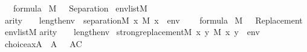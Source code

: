 \begin{isabelle}
{\isasymphi}\ {\isasymin}\ formula\ {\isasymLongrightarrow}\isanewline
{\isacharparenleft}{\kern0pt}M{\isacharcomma}{\kern0pt}\ {\isacharbrackleft}{\kern0pt}{\isacharbrackright}{\kern0pt}\ {\isasymTurnstile}\ {\isasymcdot}Separation{\isacharparenleft}{\kern0pt}{\isasymphi}{\isacharparenright}{\kern0pt}{\isasymcdot}{\isacharparenright}{\kern0pt}\ {\isasymlongleftrightarrow}\isanewline
{\isacharparenleft}{\kern0pt}{\isasymforall}env{\isasymin}list{\isacharparenleft}{\kern0pt}M{\isacharparenright}{\kern0pt}{\isachardot}{\kern0pt}\isanewline
\isaindent{{\isacharparenleft}{\kern0pt}\ \ \ }arity{\isacharparenleft}{\kern0pt}{\isasymphi}{\isacharparenright}{\kern0pt}\ {\isasymle}\ {}\ {\isacharplus}{\kern0pt}\isactrlsub {\isasymomega}\ length{\isacharparenleft}{\kern0pt}env{\isacharparenright}{\kern0pt}\ {\isasymlongrightarrow}\ separation{\isacharparenleft}{\kern0pt}{\isacharhash}{\kern0pt}{\isacharhash}{\kern0pt}M{\isacharcomma}{\kern0pt}\ {\isasymlambda}x{\isachardot}{\kern0pt}\ M{\isacharcomma}{\kern0pt}\ {\isacharbrackleft}{\kern0pt}x{\isacharbrackright}{\kern0pt}\ {\isacharat}{\kern0pt}\ env\ {\isasymTurnstile}\ {\isasymphi}{\isacharparenright}{\kern0pt}{\isacharparenright}{\kern0pt}\isasep\isanewline\isanewline%
{\isasymphi}\ {\isasymin}\ formula\ {\isasymLongrightarrow}\isanewline
{\isacharparenleft}{\kern0pt}M{\isacharcomma}{\kern0pt}\ {\isacharbrackleft}{\kern0pt}{\isacharbrackright}{\kern0pt}\ {\isasymTurnstile}\ {\isasymcdot}Replacement{\isacharparenleft}{\kern0pt}{\isasymphi}{\isacharparenright}{\kern0pt}{\isasymcdot}{\isacharparenright}{\kern0pt}\ {\isasymlongleftrightarrow}\isanewline
{\isacharparenleft}{\kern0pt}{\isasymforall}env{\isasymin}list{\isacharparenleft}{\kern0pt}M{\isacharparenright}{\kern0pt}{\isachardot}{\kern0pt}\isanewline
\isaindent{{\isacharparenleft}{\kern0pt}\ \ \ }arity{\isacharparenleft}{\kern0pt}{\isasymphi}{\isacharparenright}{\kern0pt}\ {\isasymle}\ {}\ {\isacharplus}{\kern0pt}\isactrlsub {\isasymomega}\ length{\isacharparenleft}{\kern0pt}env{\isacharparenright}{\kern0pt}\ {\isasymlongrightarrow}\isanewline
\isaindent{{\isacharparenleft}{\kern0pt}\ \ \ }strong{\isacharunderscore}{\kern0pt}replacement{\isacharparenleft}{\kern0pt}{\isacharhash}{\kern0pt}{\isacharhash}{\kern0pt}M{\isacharcomma}{\kern0pt}\ {\isasymlambda}x\ y{\isachardot}{\kern0pt}\ M{\isacharcomma}{\kern0pt}\ {\isacharbrackleft}{\kern0pt}x{\isacharcomma}{\kern0pt}\ y{\isacharbrackright}{\kern0pt}\ {\isacharat}{\kern0pt}\ env\ {\isasymTurnstile}\ {\isasymphi}{\isacharparenright}{\kern0pt}{\isacharparenright}{\kern0pt}\isasep\isanewline\isanewline%
choice{\isacharunderscore}{\kern0pt}ax{\isacharparenleft}{\kern0pt}{\isacharhash}{\kern0pt}{\isacharhash}{\kern0pt}A{\isacharparenright}{\kern0pt}\ {\isasymlongleftrightarrow}\ A{\isacharcomma}{\kern0pt}\ {\isacharbrackleft}{\kern0pt}{\isacharbrackright}{\kern0pt}\ {\isasymTurnstile}\ {\isasymcdot}AC{\isasymcdot}%
\end{isabelle}%
